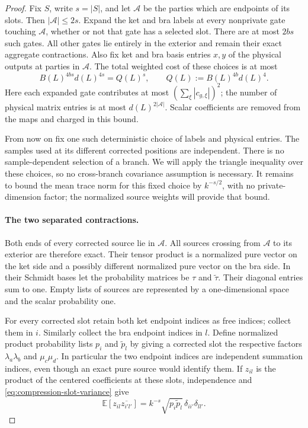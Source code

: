 \documentclass[11pt]{article}
\numberwithin{equation}{section}
\theoremstyle{definition}
\theoremstyle{remark}
\begin{document}
\begin{proof}
Fix $S$, write $s=|S|$, and let $\mathcal A$ be the parties which are
endpoints of its slots.  Then $|\mathcal A|\le2s$.  Expand the ket and
bra labels at every nonprivate gate touching $\mathcal A$, whether or
not that gate has a selected slot.  There are at most $2bs$ such gates.
All other gates lie entirely in the exterior and remain their exact
aggregate contractions.  Also fix ket and bra basis entries $x,y$ of
the physical outputs at parties in $\mathcal A$.  The total weighted
cost of these choices is at most
\begin{equation}
 B(L)^{4bs}d(L)^{4s}=Q(L)^s,
 \qquad Q(L):=B(L)^{4b}d(L)^4.
 \label{eq:compression-choice-cost}
\end{equation}
Here each expanded gate contributes at most
$(\sum_\xi|c_{g,\xi}|)^2$; the number of physical matrix entries is at
most $d(L)^{2|\mathcal A|}$.  Scalar coefficients are removed from the
maps and charged in this bound.

From now on fix one such deterministic choice of labels and physical
entries.  The samples used at its different corrected positions are
independent.  There is no sample-dependent selection of a branch.  We
will apply the triangle inequality over these choices, so no
cross-branch covariance assumption is necessary.  It remains to bound the
mean trace norm for this fixed choice by $k^{-s/2}$, with no private-dimension
factor; the normalized source weights will provide that bound.

\paragraph{The two separated contractions.}
Both ends of every corrected source lie in $\mathcal A$.  All sources
crossing from $\mathcal A$ to its exterior are therefore exact.  Their
tensor product is a normalized pure vector on the ket side and a
possibly different normalized pure vector on the bra side.  In their
Schmidt bases let the probability matrices be $\tau$ and
$\widetilde\tau$.  Their diagonal entries sum to one.  Empty lists of
sources are represented by a one-dimensional space and the scalar
probability one.

For every corrected slot retain both ket endpoint indices as free
indices; collect them in $i$.  Similarly collect the bra endpoint
indices in $l$.  Define normalized product probability lists $p_i$ and
$\widetilde p_l$ by giving a corrected slot the respective factors
$\lambda_a\lambda_b$ and $\mu_c\mu_d$.  In particular the two endpoint
indices are independent summation indices, even though an exact pure
source would identify them.  If $z_{il}$ is the product of the centered
coefficients at these slots, independence and
\eqref{eq:compression-slot-variance} give
\begin{equation}
 \mathbb E[z_{il}\overline{z_{i'l'}}]
       =k^{-s}\sqrt{p_i\widetilde p_l}\,
                      \delta_{ii'}\delta_{ll'}.
 \label{eq:compression-product-covariance}
\end{equation}


\end{proof}
\end{document}
